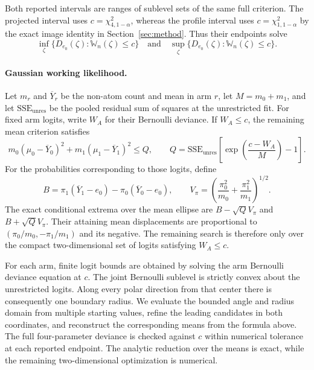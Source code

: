 \documentclass[11pt]{article}
\begin{document}
Both reported intervals are ranges of sublevel sets of the same full criterion. The projected interval uses $c=\chi^2_{4,1-\alpha}$, whereas the profile interval uses $c=\chi^2_{1,1-\alpha}$ by the exact image identity in Section~\ref{sec:method}. Thus their endpoints solve
\[
  \inf_{\zeta}\{D_{e_0}(\zeta):\mathbb{W}_n(\zeta)\leq c\}
  \quad\text{and}\quad
  \sup_{\zeta}\{D_{e_0}(\zeta):\mathbb{W}_n(\zeta)\leq c\}.
\]

\paragraph{Gaussian working likelihood.}
Let $m_r$ and $\overline{Y}_r$ be the non-atom count and mean in arm $r$, let $M=m_0+m_1$, and let $\mathrm{SSE}_{\mathrm{unres}}$ be the pooled residual sum of squares at the unrestricted fit. For fixed arm logits, write $W_A$ for their Bernoulli deviance. If $W_A\leq c$, the remaining mean criterion satisfies
\[
  m_0(\mu_0-\overline{Y}_0)^2
  +m_1(\mu_1-\overline{Y}_1)^2
  \leq
  Q,
  \qquad
  Q=\mathrm{SSE}_{\mathrm{unres}}\left[\exp\left(\frac{c-W_A}{M}\right)-1\right].
\]
For the probabilities corresponding to those logits, define
\[
  B=\pi_1(\overline{Y}_1-e_0)-\pi_0(\overline{Y}_0-e_0),
  \qquad
  V_\pi=\left(\frac{\pi_0^2}{m_0}+\frac{\pi_1^2}{m_1}\right)^{1/2}.
\]
The exact conditional extrema over the mean ellipse are $B-\sqrt Q V_\pi$ and $B+\sqrt Q V_\pi$. Their attaining mean displacements are proportional to $(\pi_0/m_0,-\pi_1/m_1)$ and its negative. The remaining search is therefore only over the compact two-dimensional set of logits satisfying $W_A\leq c$.

For each arm, finite logit bounds are obtained by solving the arm Bernoulli deviance equation at $c$. The joint Bernoulli sublevel is strictly convex about the unrestricted logits. Along every polar direction from that center there is consequently one boundary radius. We evaluate the bounded angle and radius domain from multiple starting values, refine the leading candidates in both coordinates, and reconstruct the corresponding means from the formula above. The full four-parameter deviance is checked against $c$ within numerical tolerance at each reported endpoint. The analytic reduction over the means is exact, while the remaining two-dimensional optimization is numerical.
\end{document}
